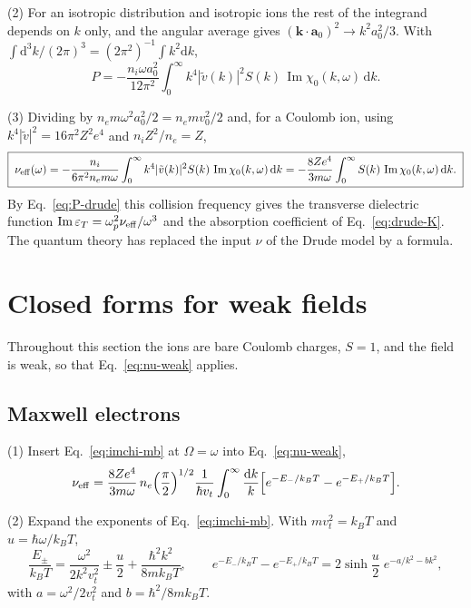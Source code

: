 \documentclass[11pt]{article}
\numberwithin{equation}{section}
\newcommand{\av}{\mathbf a_0}
\newcommand{\kv}{\mathbf k}
\newcommand{\nueff}{\nu_{\rm eff}}
\newcommand{\dd}{\mathrm d}
\newcommand{\kB}{k_B}
\DeclareMathOperator{\Imag}{Im}
\begin{document}
{\noindent}(2) For an isotropic distribution and isotropic ions the rest of the
integrand depends on $k$ only, and the angular average gives
$(\kv\cdot\av)^2\to k^2a_0^2/3$. With $\int\dd^3k/(2\pi)^3=(2\pi^2)^{-1}\int k^2\dd k$,
\begin{equation}
P=-\frac{n_i\omega a_0^2}{12\pi^2}\int_0^\infty k^4|\tilde v(k)|^2S(k)\,\Imag\chi_0(k,\omega)\,\dd k.
\end{equation}

{\noindent}(3) Dividing by $n_em\omega^2a_0^2/2=n_emv_0^2/2$ and, for a Coulomb
ion, using $k^4|\tilde v|^2=16\pi^2Z^2e^4$ and $n_iZ^2/n_e=Z$,
\begin{equation}
\boxed{\;\nueff(\omega)=-\frac{n_i}{6\pi^2n_em\omega}\int_0^\infty k^4|\tilde v(k)|^2S(k)\,\Imag\chi_0(k,\omega)\,\dd k
=-\frac{8Ze^4}{3m\omega}\int_0^\infty S(k)\,\Imag\chi_0(k,\omega)\,\dd k.\;}
\label{eq:nu-weak}
\end{equation}
By Eq.~\eqref{eq:P-drude} this collision frequency gives the transverse
dielectric function $\Imag\varepsilon_T=\omega_p^2\nueff/\omega^3$ and the
absorption coefficient of Eq.~\eqref{eq:drude-K}. The quantum theory has
replaced the input $\nu$ of the Drude model by a formula.

\section{Closed forms for weak fields}
\label{sec:closed}
Throughout this section the ions are bare Coulomb charges, $S=1$, and the field
is weak, so that Eq.~\eqref{eq:nu-weak} applies.

\subsection{Maxwell electrons}
{\noindent}(1) Insert Eq.~\eqref{eq:imchi-mb} at $\Omega=\omega$ into
Eq.~\eqref{eq:nu-weak},
\begin{equation}
\nueff=\frac{8Ze^4}{3m\omega}\,n_e\Big(\frac\pi2\Big)^{1/2}\frac{1}{\hbar v_t}
\int_0^\infty\frac{\dd k}{k}\Big[e^{-E_-/\kB T}-e^{-E_+/\kB T}\Big].
\end{equation}

{\noindent}(2) Expand the exponents of Eq.~\eqref{eq:imchi-mb}. With
$m v_t^2=\kB T$ and $u=\hbar\omega/\kB T$,
\begin{equation}
\frac{E_\pm}{\kB T}=\frac{\omega^2}{2k^2v_t^2}\pm\frac u2+\frac{\hbar^2k^2}{8m\kB T},
\qquad
e^{-E_-/\kB T}-e^{-E_+/\kB T}=2\sinh\frac u2\;e^{-a/k^2-bk^2},
\end{equation}
with $a=\omega^2/2v_t^2$ and $b=\hbar^2/8m\kB T$.
\end{document}
